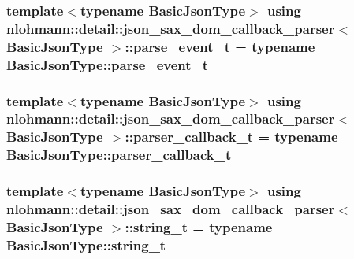 \subsubsection[{\texorpdfstring{parse\+\_\+event\+\_\+t}{parse_event_t}}]{\setlength{\rightskip}{0pt plus 5cm}template$<$typename Basic\+Json\+Type$>$ using {\bf nlohmann\+::detail\+::json\+\_\+sax\+\_\+dom\+\_\+callback\+\_\+parser}$<$ Basic\+Json\+Type $>$\+::{\bf parse\+\_\+event\+\_\+t} =  typename Basic\+Json\+Type\+::parse\+\_\+event\+\_\+t}\hypertarget{classnlohmann_1_1detail_1_1json__sax__dom__callback__parser_aac6d706967b2ecc2510e172577d8550b}{}\label{classnlohmann_1_1detail_1_1json__sax__dom__callback__parser_aac6d706967b2ecc2510e172577d8550b}
\subsubsection[{\texorpdfstring{parser\+\_\+callback\+\_\+t}{parser_callback_t}}]{\setlength{\rightskip}{0pt plus 5cm}template$<$typename Basic\+Json\+Type$>$ using {\bf nlohmann\+::detail\+::json\+\_\+sax\+\_\+dom\+\_\+callback\+\_\+parser}$<$ Basic\+Json\+Type $>$\+::{\bf parser\+\_\+callback\+\_\+t} =  typename Basic\+Json\+Type\+::parser\+\_\+callback\+\_\+t}\hypertarget{classnlohmann_1_1detail_1_1json__sax__dom__callback__parser_a4f636086fa8e7cf26c35c8afd50903ce}{}\label{classnlohmann_1_1detail_1_1json__sax__dom__callback__parser_a4f636086fa8e7cf26c35c8afd50903ce}
\subsubsection[{\texorpdfstring{string\+\_\+t}{string_t}}]{\setlength{\rightskip}{0pt plus 5cm}template$<$typename Basic\+Json\+Type$>$ using {\bf nlohmann\+::detail\+::json\+\_\+sax\+\_\+dom\+\_\+callback\+\_\+parser}$<$ Basic\+Json\+Type $>$\+::{\bf string\+\_\+t} =  typename Basic\+Json\+Type\+::string\+\_\+t}\hypertarget{classnlohmann_1_1detail_1_1json__sax__dom__callback__parser_a00e7d95d82d5d8a43421526a42a8eabc}{}\label{classnlohmann_1_1detail_1_1json__sax__dom__callback__parser_a00e7d95d82d5d8a43421526a42a8eabc}


